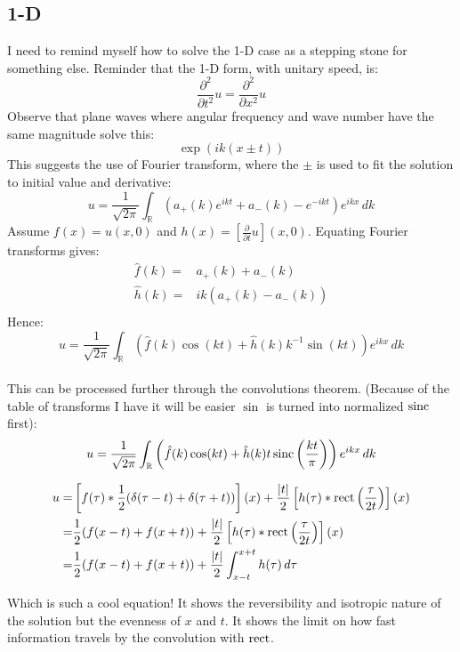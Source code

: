 \subsection{1-D}
I need to remind myself how to solve the 1-D case as a stepping stone for something else.
Reminder that the 1-D form, with unitary speed, is:
\[ \frac{\partial^2}{\partial t^2} u = \frac{\partial^2}{\partial x^2}u\]
Observe that plane waves where angular frequency and wave number have the same magnitude solve this:
\[ \exp(ik(x\pm t))\]
This suggests the use of Fourier transform, where the $\pm$ is used to fit the solution to initial value and derivative:
\[ u = \frac{1}{\sqrt{2\pi}}\int_\mathbb{R}(a_+(k)e^{ikt}+a_-(k)-e^{-ikt})e^{ikx}\,dk\]
Assume $f(x) = u(x,0)$ and $h(x) = \left[\frac{\partial}{\partial t}u\right](x,0)$.
Equating Fourier transforms gives:
\begin{equation*}
\begin{aligned}
	\hat{f}(k) =& a_+(k)+a_-(k) \\
	\hat{h}(k) =& ik(a_+(k)-a_-(k)) \\
\end{aligned}
\end{equation*}
Hence:
\[ u = \frac{1}{\sqrt{2\pi}}\int_\mathbb{R}(\hat{f}(k)\cos(kt)+\hat{h}(k)k^{-1}\sin(kt))e^{ikx}\,dk\]
\\

This can be processed further through the convolutions theorem.
(Because of the table of transforms I have it will be easier $\sin$ is turned into normalized $\operatorname{sinc}$ first):
\[ u = \frac{1}{\sqrt{2\pi}}\int_\mathbb{R}\left(\hat{f}(k)\cos(kt)+\hat{h}(k)t\operatorname{sinc}\left(\frac{kt}{\pi}\right)\right)e^{ikx}\,dk\]

\begin{equation*}
\begin{aligned}
	u =& \left[f(\tau)\ast\frac{1}{2}(\delta(\tau-t)+\delta(\tau+t))\right](x) + \frac{|t|}{2}\left[h(\tau)\ast\operatorname{rect}\left(\frac{\tau}{2t}\right)\right](x)\\
	 =&  \frac{1}{2}(f(x-t)+f(x+t)) + \frac{|t|}{2}\left[h(\tau)\ast\operatorname{rect}\left(\frac{\tau}{2t}\right)\right](x)\\
	 =&  \frac{1}{2}(f(x-t)+f(x+t)) + \frac{|t|}{2}\int_{x-t}^{x+t}h(\tau)\,d\tau\\
\end{aligned}
\end{equation*}

Which is such a cool equation!
It shows the reversibility and isotropic nature of the solution but the evenness of $x$ and $t$.
It shows the limit on how fast information travels by the convolution with $\operatorname{rect}$.
